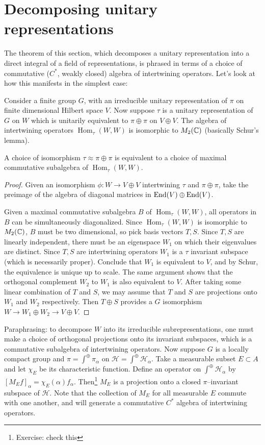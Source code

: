 \documentclass[11pt]{amsart}
\renewcommand{\H}{\mathcal{H}}
\newcommand{\Hom}{\operatorname{Hom}}
\begin{document}
\section{Decomposing unitary representations}
The theorem of this section, which decomposes a unitary representation into a direct integral of a field of representations, is phrased in terms of a choice of commutative ($C^{*}$, weakly closed) algebra of intertwining operators. Let's look at how this manifests in the simplest case: 


Consider a finite group $G$, with an irreducible unitary representation of $\pi$ on finite dimensional Hilbert space  $V$. Now suppose $\tau$ is a unitary representation of $G$ on $W$ which is unitarily equivalent to $\pi\oplus\pi$ on $V\oplus V$. The algebra of intertwining operators $\Hom_{\tau}(W,W)$ is isomorphic to $M_{2}(\mathbb{C})$ (basically Schur's lemma). 
\begin{claim}
	A choice of isomorphism $\tau \approx \pi \oplus \pi$ is equivalent to a choice of maximal commutative subalgebra of $\Hom_{\tau}(W,W)$.
\end{claim}
\begin{proof}
	Given an isomorphism $\phi:W\to V\oplus V$ intertwining $\tau$ and $\pi \oplus \pi$, take the preimage of the algebra of diagonal matrices in $\operatorname{End}(V)\oplus\operatorname{End}(V)$. 

	\par Given a maximal commutative subalgebra $B$ of $\Hom_{\tau}(W,W)$, all operators in $B$ can be simultaneously diagonalized. Since $\Hom_{\tau}(W,W)$ is isomorphic to $M_{2}(\mathbb{C})$, $B$ must be two dimensional, so pick basis vectors $T,S$. Since $T,S$ are linearly independent, there must be an eigenspace $W_{1}$ on which their eigenvalues are distinct. Since $T,S$ are intertwining operators $W_{1}$ is a $\tau$ invariant subspace (which is necessarily proper). Conclude that $W_{1}$ is equivalent to $V$, and by Schur, the equivalence is unique up to scale. The same argument shows that the orthogonal complement $W_{2}$ to $W_{1}$ is also equivalent to $V$. After taking some linear combination of $T$ and $S$, we may assume that $T$ and $S$ are projections onto $W_{1}$ and $W_{2}$ respectively. Then $T\oplus S$ provides a $G$ isomorphism $W\to W_{1}\oplus W_{2}\to V\oplus V$.
\end{proof}

Paraphrasing: to decompose $W$ into its irreducible subrepresentations, one must make a choice of orthogonal projections onto its invariant subspaces, which is a commutative subalgebra of intertwining operators. Now suppose $G$ is a locally compact group and $\pi=\int^{\oplus}\pi_{\alpha}$ on $\H=\int^{\oplus}\H_{\alpha}$. Take a measurable subset $E\subset A$ and let $\chi_{E}$ be its characteristic function. Define an operator on $\int^{\oplus}\H_{\alpha}$ by $\left[M_{E}f\right]_{\alpha}=\chi_{E}(\alpha)f_{\alpha}$. Then\footnote{Exercise: check this} $M_{E}$ is a projection onto a closed $\pi$--invariant subspace of $\H$. Note that the collection of $M_{E}$ for all measurable $E$ commute with one another, and will generate a commutative $C^{*}$ algebra of intertwining operators. 
\end{document}
